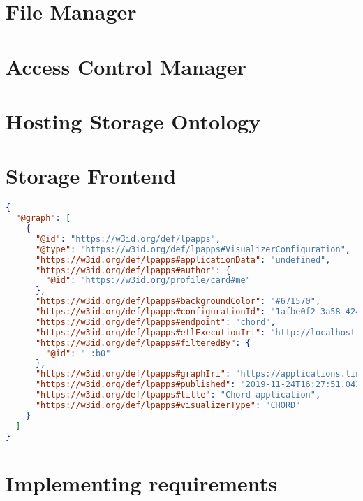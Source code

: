 \section{File Manager}

\section{Access Control Manager}



\section{Hosting Storage Ontology}


\section{Storage Frontend}

\begin{lstlisting}[language=json]
{
  "@graph": [
    {
      "@id": "https://w3id.org/def/lpapps",
      "@type": "https://w3id.org/def/lpapps#VisualizerConfiguration",
      "https://w3id.org/def/lpapps#applicationData": "undefined",
      "https://w3id.org/def/lpapps#author": {
        "@id": "https://w3id.org/profile/card#me"
      },
      "https://w3id.org/def/lpapps#backgroundColor": "#671570",
      "https://w3id.org/def/lpapps#configurationId": "1afbe0f2-3a58-424e-91ec-6a41ae8717b3",
      "https://w3id.org/def/lpapps#endpoint": "chord",
      "https://w3id.org/def/lpapps#etlExecutionIri": "http://localhost:8080/resources/executions/1574612566772-0-2f47c643-55c0-419d-9313-1381cec14b1d",
      "https://w3id.org/def/lpapps#filteredBy": {
        "@id": "_:b0"
      },
      "https://w3id.org/def/lpapps#graphIri": "https://applications.linkedpipes.com/graph/84b34afd-6990-411a-920e-cb402b29797f-16dd6a86-2743-42cb-aea7-368b14aa0eff",
      "https://w3id.org/def/lpapps#published": "2019-11-24T16:27:51.043Z",
      "https://w3id.org/def/lpapps#title": "Chord application",
      "https://w3id.org/def/lpapps#visualizerType": "CHORD"
    }
  ]
}
\end{lstlisting}

\section{Implementing requirements}